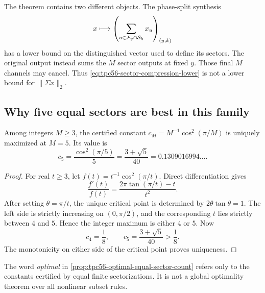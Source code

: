 The theorem contains two different objects.  The phase-split synthesis
\begin{equation}
 x\longmapsto
 \left(\sum_{u\in\mathcal F_y\cap\mathcal S_k}x_u\right)_{(y,k)}
 \label{eq:tpc56-phase-split-synthesis}
\end{equation}
has a lower bound on the distinguished vector used to define its sectors.
The original output instead sums the \(M\) sector outputs at fixed \(y\).
Those final \(M\) channels may cancel.  Thus
\eqref{eq:tpc56-sector-compression-lower} is not a lower bound for
\(\|\Sigma x\|_2\).

\subsection{Why five equal sectors are best in this family}

\begin{proposition}
\label{prop:tpc56-optimal-equal-sector-count}
Among integers \(M\ge3\), the certified constant
\(c_M=M^{-1}\cos^2(\pi/M)\) is uniquely maximized at \(M=5\).  Its value is
\begin{equation}
 \boxed{
 c_5=\frac{\cos^2(\pi/5)}5
     =\frac{3+\sqrt5}{40}
     =0.1309016994\ldots .}
 \label{eq:tpc56-pentant-constant}
\end{equation}
\end{proposition}

\begin{proof}
For real \(t\ge3\), let
\(f(t)=t^{-1}\cos^2(\pi/t)\).  Direct differentiation gives
\begin{equation}
 \frac{f'(t)}{f(t)}
 =\frac{2\pi\tan(\pi/t)-t}{t^2}.
 \label{eq:tpc56-equal-sector-derivative}
\end{equation}
After setting \(\theta=\pi/t\), the unique critical point is determined by
\(2\theta\tan\theta=1\).  The left side is strictly increasing on
\((0,\pi/2)\), and the corresponding \(t\) lies strictly between \(4\)
and \(5\).  Hence the integer maximum is either \(4\) or \(5\).  Now
\begin{equation}
 c_4=\frac18,
 \qquad
 c_5=\frac{3+\sqrt5}{40}>\frac18.
 \label{eq:tpc56-four-five-comparison}
\end{equation}
The monotonicity on either side of the critical point proves uniqueness.
\end{proof}

The word \emph{optimal} in \cref{prop:tpc56-optimal-equal-sector-count}
refers only to the constants certified by equal finite sectorizations.  It
is not a global optimality theorem over all nonlinear subset rules.

